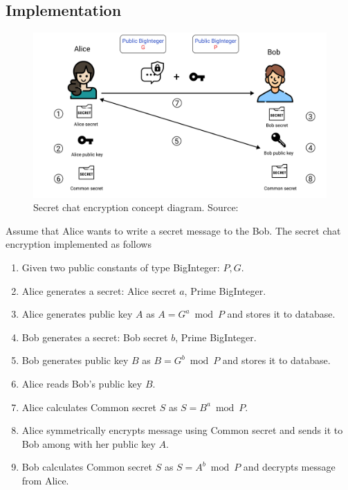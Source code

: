 \subsection{Implementation}\label{subsec:implementation}
\begin{figure}[H]
    \centering
    \includegraphics[width=1\textwidth]{Pictures/Key_Exchange}
    \caption{Secret chat encryption concept diagram. Source: }\label{fig:figure7}
\end{figure}
Assume that Alice wants to write a secret message to the Bob.
The secret chat encryption implemented as follows
\begin{enumerate}
    \item Given two public constants of type BigInteger: $P, G$.
    \item Alice generates a secret: Alice secret $a$, Prime BigInteger.
    \item Alice generates public key $A$ as $A=G^a \bmod P$ and stores it to database.
    \item Bob generates a secret: Bob secret $b$, Prime BigInteger.
    \item Bob generates public key $B$ as $B=G^b \bmod P$ and stores it to database.
    \item Alice reads Bob's public key $B$.
    \item Alice calculates Common secret $S$ as $S = B^a \bmod P$.
    \item Alice symmetrically encrypts message using Common secret and sends it to Bob among with her public key $A$.
    \item Bob calculates Common secret $S$ as $S = A^b \bmod P$ and decrypts message from Alice.
\end{enumerate}